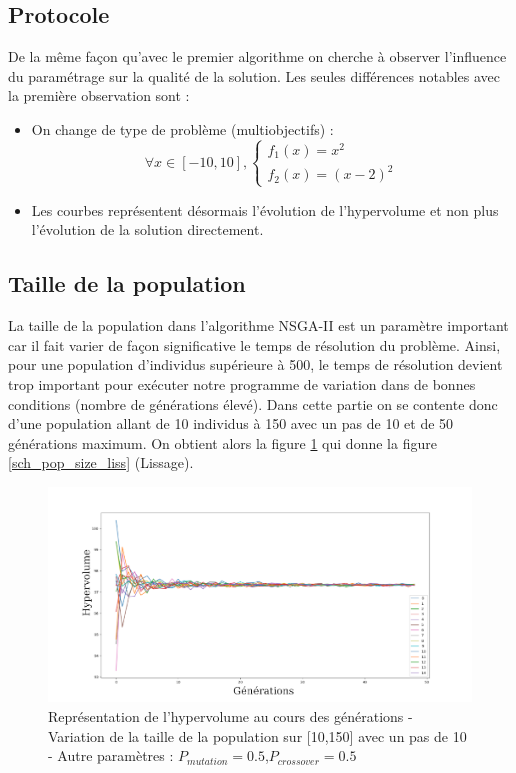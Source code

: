 \documentclass[12pt]{report}
\begin{document}
      \subsection{Protocole}

      De la même façon qu'avec le premier algorithme on cherche à observer l'influence du paramétrage sur la qualité de la solution. Les seules différences notables avec la première observation sont :
      \begin{itemize}
        \item On change de type de problème (multiobjectifs) :
        $$
        \forall x \in [-10,10],
        \left\{
          \begin{array}{ll}
             f_1(x) = x^2 \\
             f_2(x) = (x-2)^2
          \end{array}
        \right.
        $$
        \item Les courbes représentent désormais l'évolution de l'hypervolume et non plus l'évolution de la solution directement.
      \end{itemize}


      \subsection{Taille de la population}
      La taille de la population dans l'algorithme NSGA-II est un paramètre important car il fait varier de façon significative le temps de résolution du problème. Ainsi, pour une population d'individus supérieure à 500, le temps de résolution devient trop important pour exécuter notre programme de variation dans de bonnes conditions (nombre de générations élevé). Dans cette partie on se contente donc d'une population allant de 10 individus à 150 avec un pas de 10 et de 50 générations maximum. On obtient alors la figure \ref{sch_pop_size_moy} qui donne la figure \ref{sch_pop_size_liss} (Lissage).

      \begin{figure}[h]
        \centering
        \includegraphics[width=18cm]{img/pop_size_sch_moy.png}
        \caption{Représentation de l'hypervolume au cours des générations - Variation de la taille de la population sur [10,150] avec un pas de 10 - Autre paramètres : $P_{mutation} = 0.5$,$P_{crossover} = 0.5$}
        \label{sch_pop_size_moy}
      \end{figure}
\end{document}
